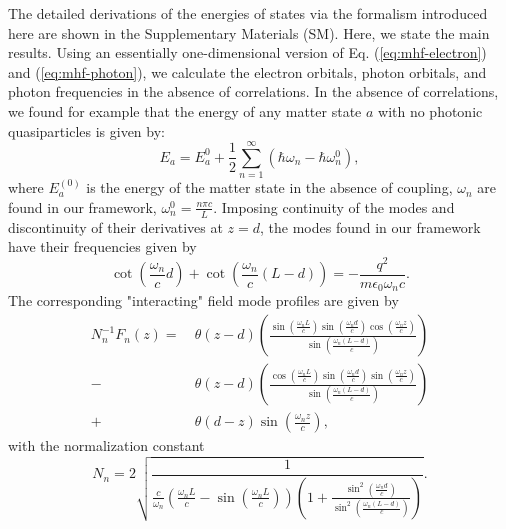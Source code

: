 \documentclass[aps,prl,twocolumn,
	groupedaddress,superscriptaddress,
	amsfonts,amssymb,amsmath,floatfix,
	citeautoscript]{revtex4-1}
\begin{document}
The detailed derivations of the energies of states via the formalism introduced here are shown in the Supplementary Materials (SM). Here, we state the main results. Using an essentially one-dimensional version of Eq. (\ref{eq:mhf-electron}) and (\ref{eq:mhf-photon}), we calculate the electron orbitals, photon orbitals, and photon frequencies in the absence of correlations. In the absence of correlations, we found for example that the energy of any matter state $a$ with no photonic quasiparticles is given by:
\begin{equation}
E_{a} = E^{0}_a + \frac{1}{2}\sum\limits_{n=1}^{\infty}(\hbar\omega_n - \hbar\omega_n^0),
\label{eq:casimir}
\end{equation}
where $E_a^{(0)}$ is the energy of the matter state in the absence of coupling, $\omega_n$ are found in our framework, $\omega_n^0 = \frac{n\pi c}{L}$. Imposing continuity of the modes and discontinuity of their derivatives at $z=d$, the modes found in our framework have their frequencies given by
\begin{equation}
\cot\left(\frac{\omega_n}{c}d \right)+\cot\left(\frac{\omega_n}{c}(L-d) \right) = -\frac{q^2}{m\epsilon_0\omega_nc}.
\label{eq:cot}
\end{equation}
The corresponding "interacting" field mode profiles are given by
\begin{align}\label{eq:field_mode}
N_n^{-1}F_n(z) =~ &\theta(z-d) \left(\frac{\sin\left(\frac{\omega_nL}{c}\right)\sin\left(\frac{\omega_nd}{c}\right)\cos\left(\frac{\omega_nz}{c}\right)}{\sin\left(\frac{\omega_n(L-d)}{c}\right)}\right) \nonumber \\ 
-&\theta (z-d) \left(\frac{\cos\left(\frac{\omega_nL}{c}\right)\sin\left(\frac{\omega_nd}{c}\right)\sin\left(\frac{\omega_nz}{c}\right)}{\sin\left(\frac{\omega_n(L-d)}{c}\right)}\right) \nonumber \\ 
+&\theta (d-z) \sin\left(\frac{\omega_n z}{c} \right),
\end{align}
with the normalization constant
\begin{equation}\label{eq:mode_normalization}
N_n = 2\sqrt{\frac{1}{\frac{c}{\omega_n}\left(\frac{\omega_nL}{c}-\sin\left(\frac{\omega_nL}{c}\right) \right)\left(1+\frac{\sin^2\left(\frac{\omega_nd}{c}\right)}{\sin^2\left(\frac{\omega_n(L-d)}{c}\right)} \right)}}.
\end{equation}
\end{document}
